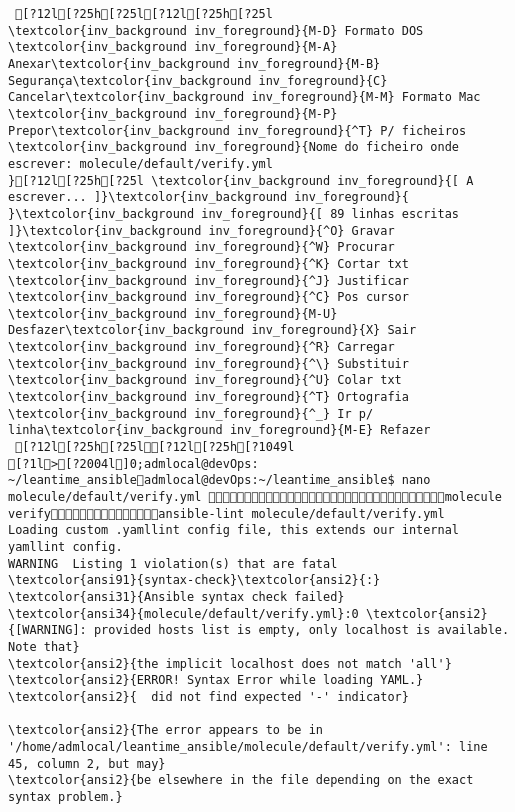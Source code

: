 \documentclass{scrartcl}
\begin{document}
\begin{Verbatim}
 [?12l[?25h[?25l[?12l[?25h[?25l            \textcolor{inv_background inv_foreground}{M-D} Formato DOS           \textcolor{inv_background inv_foreground}{M-A} Anexar\textcolor{inv_background inv_foreground}{M-B} Segurança\textcolor{inv_background inv_foreground}{C} Cancelar\textcolor{inv_background inv_foreground}{M-M} Formato Mac           \textcolor{inv_background inv_foreground}{M-P} Prepor\textcolor{inv_background inv_foreground}{^T} P/ ficheiros
\textcolor{inv_background inv_foreground}{Nome do ficheiro onde escrever: molecule/default/verify.yml                                             }[?12l[?25h[?25l \textcolor{inv_background inv_foreground}{[ A escrever... ]}\textcolor{inv_background inv_foreground}{          }\textcolor{inv_background inv_foreground}{[ 89 linhas escritas ]}\textcolor{inv_background inv_foreground}{^O} Gravar     \textcolor{inv_background inv_foreground}{^W} Procurar   \textcolor{inv_background inv_foreground}{^K} Cortar txt \textcolor{inv_background inv_foreground}{^J} Justificar \textcolor{inv_background inv_foreground}{^C} Pos cursor \textcolor{inv_background inv_foreground}{M-U} Desfazer\textcolor{inv_background inv_foreground}{X} Sair       \textcolor{inv_background inv_foreground}{^R} Carregar   \textcolor{inv_background inv_foreground}{^\} Substituir \textcolor{inv_background inv_foreground}{^U} Colar txt  \textcolor{inv_background inv_foreground}{^T} Ortografia \textcolor{inv_background inv_foreground}{^_} Ir p/ linha\textcolor{inv_background inv_foreground}{M-E} Refazer
 [?12l[?25h[?25l[?12l[?25h[?1049l
[?1l>[?2004l]0;admlocal@devOps: ~/leantime_ansibleadmlocal@devOps:~/leantime_ansible$ nano molecule/default/verify.yml molecule verifyansible-lint molecule/default/verify.yml 
Loading custom .yamllint config file, this extends our internal yamllint config.
WARNING  Listing 1 violation(s) that are fatal
\textcolor{ansi91}{syntax-check}\textcolor{ansi2}{:} \textcolor{ansi31}{Ansible syntax check failed}
\textcolor{ansi34}{molecule/default/verify.yml}:0 \textcolor{ansi2}{[WARNING]: provided hosts list is empty, only localhost is available. Note that}
\textcolor{ansi2}{the implicit localhost does not match 'all'}
\textcolor{ansi2}{ERROR! Syntax Error while loading YAML.}
\textcolor{ansi2}{  did not find expected '-' indicator}

\textcolor{ansi2}{The error appears to be in '/home/admlocal/leantime_ansible/molecule/default/verify.yml': line 45, column 2, but may}
\textcolor{ansi2}{be elsewhere in the file depending on the exact syntax problem.}


\end{Verbatim}
\end{document}
